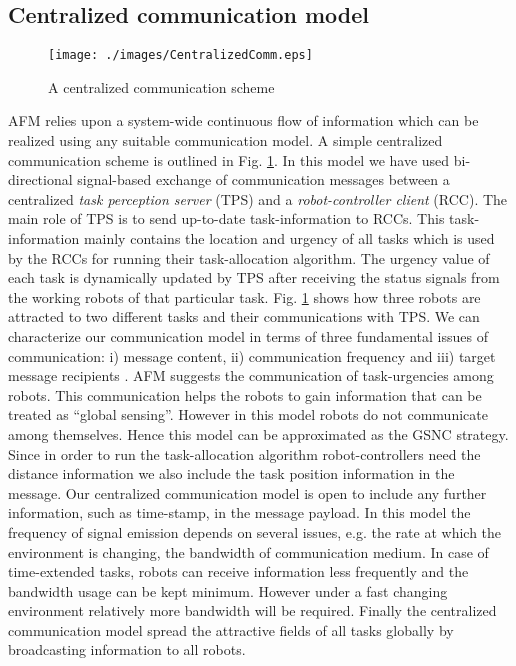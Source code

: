 \documentclass{intech}
\begin{document}
\subsection{Centralized communication model}
\begin{figure}
\centering
\texttt{[image: ./images/CentralizedComm.eps]}
\caption{\small A centralized communication scheme} %
\label{fig:ccm} %
\end{figure}
AFM relies upon a system-wide continuous flow of information which can be realized using any suitable communication model. A simple centralized communication scheme is outlined in Fig. \ref{fig:ccm}. In this model we have used bi-directional signal-based exchange of communication messages between a centralized \textit{task perception server} (TPS) and a \textit{robot-controller client} (RCC). The main role of TPS is to send up-to-date task-information to RCCs. This  task-information mainly contains the location and urgency of all tasks  which is used by the RCCs for running their task-allocation algorithm. The urgency value of each task is dynamically updated  by TPS after receiving the  status signals from the working robots of that particular task. Fig. \ref{fig:ccm} shows how three robots are attracted to two different tasks and their communications with TPS.
We can characterize our communication model in terms of three fundamental issues of communication: 
i) message content, ii) communication frequency and iii) target message recipients \citep{Gerkey+2001}.
AFM suggests the communication of task-urgencies  among robots. This communication helps the robots to gain information that can be  treated as ``global sensing''. However in this model  robots do not communicate among themselves. Hence this model can be approximated as the GSNC strategy. Since in order to run the task-allocation algorithm robot-controllers need the distance information we also include the task position information in  the message. Our centralized communication model is open to include any further information, such as time-stamp, in the message payload. In this model the frequency of signal emission depends on several issues, e.g. the rate at which the environment is changing, the bandwidth of communication medium. In case of time-extended tasks, robots can receive information less frequently and the  bandwidth usage can be kept  minimum. However under a fast changing environment relatively more bandwidth will be required.  Finally the centralized communication model spread the attractive fields of all tasks globally by broadcasting information to all robots.  
\end{document}
